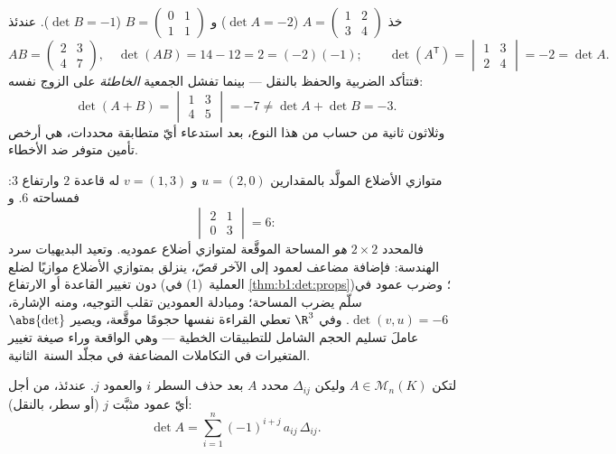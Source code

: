 \begin{example}
\label{ex:b1:det:rulescheck}
خذ $A = \begin{pmatrix} 1 & 2\\ 3 & 4\end{pmatrix}$ ($\det A =
-2$) و $B = \begin{pmatrix} 0 & 1\\ 1 & 1\end{pmatrix}$ ($\det
B = -1$). عندئذ
\[
AB = \begin{pmatrix} 2 & 3\\ 4 & 7\end{pmatrix},
\quad \det(AB) = 14 - 12 = 2 = (-2)(-1) ;
\qquad
\det(A^{\mathsf T}) = \begin{vmatrix} 1 & 3\\ 2 & 4
\end{vmatrix} = -2 = \det A .
\]
فتتأكد الضربية والحفظ بالنقل --- بينما
تفشل الجمعية \emph{الخاطئة} على الزوج نفسه:
\[
\det(A + B) = \begin{vmatrix} 1 & 3\\ 4 & 5\end{vmatrix} = -7
\neq \det A + \det B = -3 .
\]
وثلاثون ثانية من حساب من هذا النوع، بعد استدعاء أيّ متطابقة
محددات، هي أرخص تأمين متوفر ضد الأخطاء.
\end{example}

\begin{example}
\label{ex:b1:det:area}
متوازي الأضلاع المولَّد بالمقدارين $u = (2, 0)$ و $v = (1, 3)$ له
قاعدة $2$ وارتفاع $3$: فمساحته $6$. و
\[
\begin{vmatrix} 2 & 1\\ 0 & 3\end{vmatrix} = 6 :
\]
فالمحدد $2\times2$ \emph{هو} المساحة الموقَّعة
لمتوازي أضلاع عموديه. وتعيد البديهيات سرد الهندسة:
فإضافة مضاعف لعمود إلى الآخر \emph{قصّ}،
ينزلق بمتوازي الأضلاع موازيًا لضلع دون تغيير
القاعدة أو الارتفاع (العملية~(1) في \cref{thm:b1:det:props})؛
وضرب عمود في سلّم يضرب المساحة؛ ومبادلة العمودين تقلب
التوجيه، ومنه الإشارة، $\det(v, u) = -6$. وفي $\R^3$
تعطي القراءة نفسها حجومًا موقَّعة، ويصير $\abs{\det}$
عاملَ تسليم الحجم الشامل للتطبيقات الخطية --- وهي الواقعة
وراء صيغة تغيير المتغيرات في التكاملات المضاعفة
في مجلّد السنة~الثانية.
\end{example}

\begin{theorem}\label{thm:b1:det:cofactor}
لتكن $A \in \mathcal{M}_n(K)$ وليكن $\Delta_{ij}$ محدد
$A$ بعد حذف السطر $i$ والعمود $j$. عندئذ، من أجل أيّ عمود
مثبَّت $j$ (أو سطر، بالنقل):
\[
\det A = \sum_{i=1}^{n} (-1)^{i+j}\, a_{ij}\, \Delta_{ij} .
\]
\end{theorem}
\admitted

